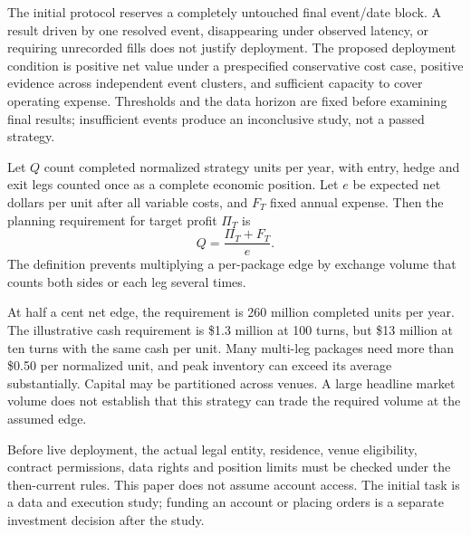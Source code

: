 \documentclass[11pt]{article}
\theoremstyle{remark}\newtheorem{example}{Example}
\begin{document}
The initial protocol reserves a completely untouched final event/date block.
A result driven by one resolved event, disappearing under observed latency,
or requiring unrecorded fills does not justify deployment. The proposed
deployment condition is positive net value under a prespecified conservative
cost case, positive evidence across independent event clusters, and sufficient
capacity to cover operating expense. Thresholds and the data horizon are fixed
before examining final results; insufficient events produce an inconclusive
study, not a passed strategy.

Let $Q$ count completed normalized strategy units per year, with entry, hedge
and exit legs counted once as a complete economic position. Let $e$ be expected
net dollars per unit after all variable costs, and $F_T$ fixed annual expense.
Then the planning requirement for target profit $\Pi_T$ is
\begin{equation}\label{eq:tradingeconomics}
 Q=\frac{\Pi_T+F_T}{e}.
\end{equation}
The definition prevents multiplying a per-package edge by exchange volume
that counts both sides or each leg several times.

\begin{table}[htbp]\centering\small

\caption{Illustrative scale needed for \$1 million annual operating profit with
\$300,000 fixed expense. Addressable activity assumes 1\% participation in
comparable units; cash capacity assumes 100 annual turns and \$0.50 tied per
unit. None of these capacity inputs has been measured.}\label{tab:tradeecon}
\end{table}

At half a cent net edge, the requirement is 260 million completed units per
year. The illustrative cash requirement is \$1.3 million at 100 turns, but
\$13 million at ten turns with the same cash per unit. Many multi-leg packages
need more than \$0.50 per normalized unit, and peak inventory can exceed its
average substantially. Capital may be partitioned across venues. A large
headline market volume does not establish that this strategy can trade the
required volume at the assumed edge.

Before live deployment, the actual legal entity, residence, venue eligibility,
contract permissions, data rights and position limits must be checked under
the then-current rules. This paper does not assume account access. The initial
task is a data and execution study; funding an account or placing orders is a
separate investment decision after the study.
\end{document}

